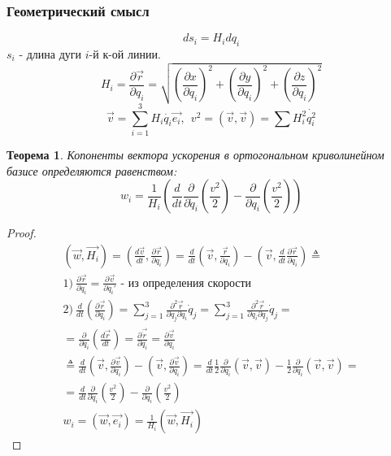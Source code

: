 \documentclass{article}
\newtheorem{teo}{Теорема}
\begin{document}
  \subsubsection*{Геометрический смысл}
  $$ ds_i = H_i dq_i $$
  $s_i$ - длина дуги $i$-й к-ой линии.
  $$ H_i = \frac{\partial \overrightarrow{r}}{\partial q_i}  = \sqrt{\left(\frac{\partial x}{\partial q_i}\right) ^2 + \left(\frac{\partial y}{\partial q_i}\right) ^2 + \left(\frac{\partial z}{\partial q_i}\right) ^2} $$
  $$ \overrightarrow{v} = \sum\limits_{i=1}^3 H_i \dot{q_i} \overrightarrow{e_i},~~ v^2 = (\overrightarrow{v}, \overrightarrow{v}) = \sum H_i^2\dot{q_i^2} $$ 
  \begin{teo}
  Копоненты вектора ускорения в ортогональном криволинейном базисе определяются равенством:
  $$ w_i = \frac{1}{H_i}\left(\frac{d}{dt} \frac{\partial}{\partial \dot q_i} \left(\frac{v^2}{2}\right) - \frac{\partial}{\partial q_i} \left(\frac{v^2}{2} \right) \right) $$
  \end{teo}
  \begin{proof}
  \begin{gather}
(\overrightarrow{w}, \overrightarrow{H_i}) = \left(\frac{d\overrightarrow{v}}{dt}, \frac{\partial \overrightarrow{r}}{\partial q_i} \right) = \frac{d}{dt} \left(\overrightarrow{v}, \frac{\overrightarrow{r}}{\partial q_i}\right) - \left(\overrightarrow{v}, \frac{d}{dt} \frac{\partial \overrightarrow{r}}{\partial q_i} \right) \triangleq \\
1) ~ \frac{\partial \overrightarrow{r}}{\partial q_i} = \frac{\partial \overrightarrow{v}}{\partial q_i'} \text{ - из определения скорости} \\
2) ~ \frac{d}{dt} \left(\frac{\partial \overrightarrow{r}}{\partial q_i} \right) = \sum \limits_{j = 1}^3 \frac{\partial^2 \overrightarrow{r}}{\partial q_j \partial q_i} \dot q_j = \sum \limits_{j = 1}^3 \frac{\partial^2 \overrightarrow{r}}{\partial q_i \partial q_j} \dot q_j = \\ 
= \frac{\partial}{\partial q_i} \left( \frac{d\overrightarrow{r}}{dt} \right) = \frac{\partial \overrightarrow{\dot r}}{\partial q_i} = \frac{\partial \overrightarrow{v}}{\partial q_i} \\
\triangleq \frac{d}{dt} \left(\overrightarrow{v}, \frac{\partial \overrightarrow{v}}{\partial q_i} \right) - \left( \overrightarrow{v}, \frac{\partial \overrightarrow{v}}{\partial q_i} \right) = \frac{d}{dt} \frac{1}{2} \frac{\partial}{\partial q_i} (\overrightarrow{v}, \overrightarrow{v}) - \frac{1}{2} \frac{\partial}{\partial q_i} (\overrightarrow{v}, \overrightarrow{v}) = \\ 
= \frac{d}{dt} \frac{\partial}{\partial \dot q_i} \left(\frac{v^2}{2} \right) - \frac{\partial}{\partial q_i} \left(\frac{v^2}{2}\right) \\
w_i = (\overrightarrow{w}, \overrightarrow{e_i}) = \frac{1}{H_i}(\overrightarrow{w}, \overrightarrow{H_i})
  \end{gather}
  \end{proof}
\end{document}
